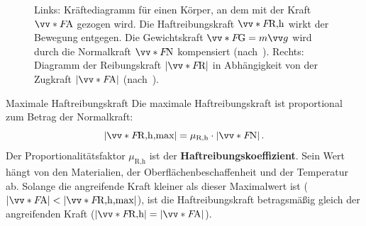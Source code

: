 \begin{figure}[h!]
\begin{subfigure}{0.55\textwidth}
{%
    }
        \caption*{}\label{fig: haftreibungskraft_zugkraft_diagramm}
    \end{subfigure}
    \caption{Links: Kräftediagramm für einen Körper, an dem mit der Kraft $\protect\ivecS{F}{\text{A}}$ gezogen wird. Die Haftreibungskraft $\protect\ivecS{F}{\text{R,h}}$ wirkt der Bewegung entgegen. Die Gewichtskraft $\protect\ivecS{F}{\text{G}} = m\protect\ivec{g}$ wird durch die Normalkraft $\protect\ivecS{F}{\text{N}}$ kompensiert (nach~\cite[S.~143]{Giancoli2010}). Rechts: Diagramm der Reibungskraft $|\protect\ivecS{F}{\text{R}}|$ in Abhängigkeit von der Zugkraft $|\protect\ivecS{F}{\text{A}}|$ (nach~\cite[S.~113]{Tipler2015}).}\label{fig: haftreibung_figure}
\end{figure}

\begin{rememberbox}[]{Maximale Haftreibungskraft}
Die maximale Haftreibungskraft ist proportional zum Betrag der Normalkraft:
\begin{equation}\label{eq: max_haftreibungskraft}
    |\ivecS{F}{\text{R,h,max}}| = \mu_{\text{R,h}} \cdot |\ivecS{F}{\text{N}}| \mDot
\end{equation}
Der Proportionalitätsfaktor $\mu_{\text{R,h}}$ ist der \textbf{Haftreibungskoeffizient}. Sein Wert hängt von den Materialien, der Oberflächenbeschaffenheit und der Temperatur ab. Solange die angreifende Kraft kleiner als dieser Maximalwert ist ($|\ivecS{F}{\text{A}}| < |\ivecS{F}{\text{R,h,max}}|$), ist die Haftreibungskraft betragsmäßig gleich der angreifenden Kraft ($|\ivecS{F}{\text{R,h}}| = |\ivecS{F}{\text{A}}|$).
\end{rememberbox}

